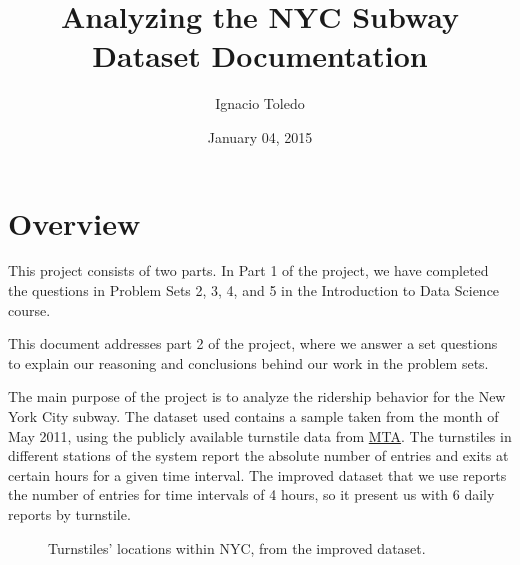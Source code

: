 \documentclass[letterpaper,10pt,english]{sphinxmanual}
\title{Analyzing the NYC Subway Dataset Documentation}
\date{January 04, 2015}
\author{Ignacio Toledo}
\begin{document}
\maketitle
\tableofcontents
{}\label{index::doc}



\chapter{Overview}
\label{overview:overview}\label{overview::doc}\label{overview:welcome-to-analyzing-the-nyc-subway-dataset-s-documentation}
This project consists of two parts. In Part 1 of the project, we have completed
the questions in Problem Sets 2, 3, 4, and 5 in the Introduction to
Data Science course.

This document addresses part 2 of the project, where we answer a set questions
to explain our reasoning and conclusions behind our work in the problem sets.

The main purpose of the project is to analyze the ridership behavior for the
New York City subway. The dataset used contains a sample taken from the month
of May 2011, using the publicly available turnstile data from
\href{http://web.mta.info/developers/turnstile.html}{MTA}. The turnstiles in
different stations of the system report the absolute number of entries and exits
at certain hours for a given time interval. The improved dataset that we use
reports the number of entries for time intervals of 4 hours, so it present us
with 6 daily reports by turnstile.
\begin{figure}[htbp]
\centering
\capstart

\caption{Turnstiles' locations within NYC, from the improved dataset.}\end{figure}
\end{document}

